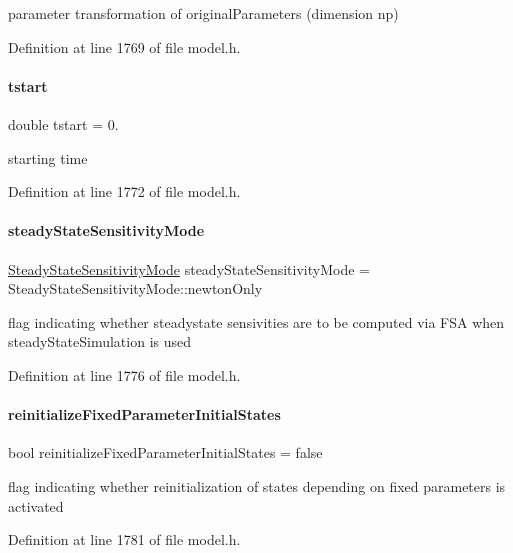 parameter transformation of {\ttfamily original\+Parameters} (dimension np) 

Definition at line 1769 of file model.\+h.

\mbox{\label{classamici_1_1_model_a514d7e4eb49966fc7d165e0f87fe7f3c}} 
\paragraph{\texorpdfstring{tstart}{tstart}}
{\footnotesize\ttfamily double tstart = 0.\hspace{0.3cm}{\ttfamily [protected]}}

starting time 

Definition at line 1772 of file model.\+h.

\mbox{\label{classamici_1_1_model_a27c46c338afef0ba6da6d0695aa5e844}} 
\paragraph{\texorpdfstring{steady\+State\+Sensitivity\+Mode}{steadyStateSensitivityMode}}
{\footnotesize\ttfamily \mbox{\hyperlink{namespaceamici_a1f7d44f04185d57423d01d47d13470a6}{Steady\+State\+Sensitivity\+Mode}} steady\+State\+Sensitivity\+Mode = Steady\+State\+Sensitivity\+Mode\+::newton\+Only\hspace{0.3cm}{\ttfamily [protected]}}

flag indicating whether steadystate sensivities are to be computed via F\+SA when steady\+State\+Simulation is used 

Definition at line 1776 of file model.\+h.

\mbox{\label{classamici_1_1_model_a48ac1f2997787adc548bd6bfcec857d5}} 
\paragraph{\texorpdfstring{reinitialize\+Fixed\+Parameter\+Initial\+States}{reinitializeFixedParameterInitialStates}}
{\footnotesize\ttfamily bool reinitialize\+Fixed\+Parameter\+Initial\+States = false\hspace{0.3cm}{\ttfamily [protected]}}

flag indicating whether reinitialization of states depending on fixed parameters is activated 

Definition at line 1781 of file model.\+h.

